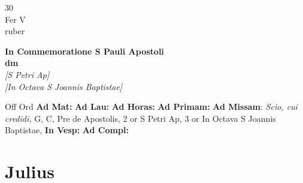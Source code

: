 \documentclass[10pt, openany]{book}
\begin{document}
    \begin{center}
        \begin{minipage}{3.5in}
            \vspace{2em}
            \begin{minipage}{0.5in}
                {\Huge 30} \\
                {\normalsize Fer V} \\
                {\normalsize ruber}
            \end{minipage}
            \begin{minipage}{3.0in}
                \textbf{ \large In Commemoratione S Pauli Apostoli \\
                \textnormal{\normalsize dm}} \\ \textit{[S Petri Ap]} \\ \textit{[In Octava S Joannis Baptistae]} \\ 
            \end{minipage}
            \begin{justify}Off Ord
                \textbf{Ad Mat: }
                \textbf{Ad Lau: }
                \textbf{Ad Horas: }
                \textbf{Ad Primam: }\textbf{Ad Missam}: \textit{Scio, cui credidi,} G, C, Pre de Apostolis, 2 or S Petri Ap, 3 or In Octava S Joannis Baptistae,  
                \textbf{In Vesp: }
                \textbf{Ad Compl: }
            \end{justify}
        \end{minipage}
    \end{center}

    \chapter{Julius}
                    
\end{document}
